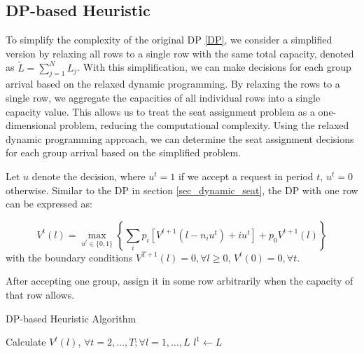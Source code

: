 

\subsection{DP-based Heuristic}
To simplify the complexity of the original DP \eqref{DP}, we consider a simplified version by relaxing all rows to a single row with the same total capacity, denoted as $\tilde{L} = \sum_{j=1}^{N} L_j$. With this simplification, we can make decisions for each group arrival based on the relaxed dynamic programming. By relaxing the rows to a single row, we aggregate the capacities of all individual rows into a single capacity value. This allows us to treat the seat assignment problem as a one-dimensional problem, reducing the computational complexity. Using the relaxed dynamic programming approach, we can determine the seat assignment decisions for each group arrival based on the simplified problem.

Let $u$ denote the decision, where $u^{t} = 1$ if we accept a request in period $t$, $u^{t} =0$ otherwise. Similar to the DP in section \ref{sec_dynamic_seat}, the DP with one row can be expressed as:

$$V^{t}(l) =  \max_{u^{t} \in \{0,1\}} \left\{ \sum_{i} p_i [V^{t+1}(l-n_i u^{t})+ i u^{t}] + p_0 V^{t+1}(l)\right\} $$
with the boundary conditions $V^{T+1}(l) =0, \forall l \geq 0$, $V^{t}(0) =0, \forall t$.

After accepting one group, assign it in some row arbitrarily when the capacity of that row allows.

\begin{algorithm}[H]
  \caption{DP-based Heuristic Algorithm}\label{algo_dp_heuris}
  Calculate $V^{t}(l)$, $\forall t =2, \ldots, T; \forall l = 1, \ldots, L$\;
  $l^{1} \gets L$\;
\end{algorithm}

